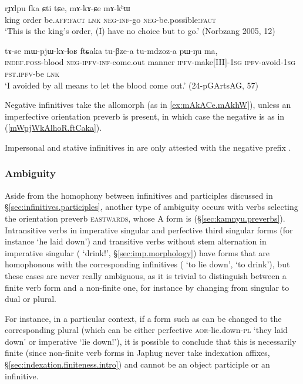 \begin{exe}
\ex \label{ex:mAkACe.mAkhW}
\gll   rɟɤlpu fka ɕti tɕe, mɤ-kɤ-ɕe mɤ-kʰɯ \\
king order be.\textsc{aff}:\textsc{fact} \textsc{lnk} \textsc{neg}-\textsc{inf}-go \textsc{neg}-be.possible:\textsc{fact} \\
\glt `This is the king's order, (I) have no choice but to go.' (Norbzang 2005, 12)
\end{exe}
 
\begin{exe}
\ex \label{mWpjWkAlhoR.ftCaka}
 \gll  tɤ-se mɯ-pjɯ-kɤ-ɬoʁ ftɕaka tu-βze-a tu-mdzoz-a pɯ-ŋu ma, \\
 \textsc{indef}.\textsc{poss}-blood \textsc{neg}-\textsc{ipfv}-\textsc{inf}-come.out manner \textsc{ipfv}-make[III]-\textsc{1sg} \textsc{ipfv}-avoid-\textsc{1sg} \textsc{pst}.\textsc{ipfv}-be \textsc{lnk} \\
\glt `I avoided by all means to let the blood come out.' (24-pGArtsAG, 57)
 \end{exe}
 
Negative infinitives take the allomorph  (as in \ref{ex:mAkACe.mAkhW}), unless an imperfective orientation preverb is present, in which case the negative is  as in (\ref{mWpjWkAlhoR.ftCaka}).

Impersonal and stative infinitives in  are only attested with the negative prefix .

\subsubsection{Ambiguity}  \label{sec:velar.inf.ambiguity}
Aside from the homophony between infinitives and participles discussed in §\ref{sec:infinitives.participles}, another type of ambiguity occurs with verbs selecting the orientation preverb \textsc{eastwards}, whose A form is  (§\ref{sec:kamnyu.preverbs}). Intransitive verbs in imperative singular and perfective third singular forms (for instance  `he laid down') and transitive verbs without stem alternation in imperative singular ( `drink!', §\ref{sec:imp.morphology}) have forms that are homophonous with the corresponding infinitives ( `to lie down',  `to drink'), but these cases are never really ambiguous, as it is trivial to distinguish between a finite verb form and a non-finite one, for instance by changing from singular to dual or plural. 

For instance, in a particular context, if a form such as  can be changed to the corresponding plural  (which can be either perfective \textsc{aor}-lie.down-\textsc{pl} `they laid down' or imperative `lie down!'), it is possible to conclude that this  is necessarily finite (since non-finite verb forms in Japhug never take indexation affixes, §\ref{sec:indexation.finiteness.intro}) and cannot be an object participle or an infinitive.

